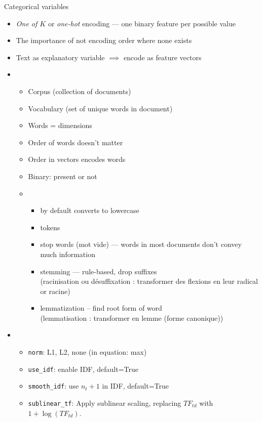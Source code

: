 




Categorical variables
\begin{itemize}
\item \textit{One of $K$ } or \textit{one-hot} encoding --- one binary feature per possible value
\item The importance of not encoding order where none exists
\item Text as explanatory variable $\implies$ encode as feature vectors
\item {}
  \begin{itemize}
  \item Corpus (collection of documents)
  \item Vocabulary (set of unique words in document)
  \item Words = dimensions
  \item Order of words doesn't matter
  \item Order in vectors encodes words
  \item Binary: present or not
  \item {}
    \begin{itemize}
    \item by default converts to lowercase
    \item tokens
    \item stop words (mot vide) --- words in most documents don't convey much information
    \item stemming --- rule-based, drop suffixes\\
      (racinisation ou désuffixation : transformer des flexions en leur radical or racine)
    \item lemmatization -- find root form of word\\
      (lemmatisation : transformer en lemme (forme canonique))
    \end{itemize}
  \end{itemize}
\item {}
  \begin{itemize}
  \item \texttt{norm}: L1, L2, none (in equation: max)
  \item \texttt{use\_idf}: enable IDF, default=True
  \item \texttt{smooth\_idf}: use $n_t+1$ in IDF, default=True
  \item \texttt{sublinear\_tf}: Apply sublinear scaling, replacing $TF_{td}$ with $1+\log(TF_{td})$.

\end{itemize}
\end{itemize}
